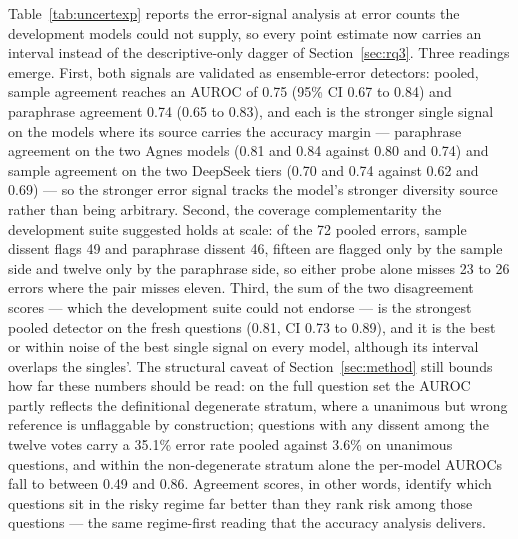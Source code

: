Table~\ref{tab:uncertexp} reports the error-signal analysis at error counts the development models could not supply, so every point estimate now carries an interval instead of the descriptive-only dagger of Section~\ref{sec:rq3}. Three readings emerge. First, both signals are validated as ensemble-error detectors: pooled, sample agreement reaches an AUROC of 0.75 (95\% CI 0.67 to 0.84) and paraphrase agreement 0.74 (0.65 to 0.83), and each is the stronger single signal on the models where its source carries the accuracy margin --- paraphrase agreement on the two Agnes models (0.81 and 0.84 against 0.80 and 0.74) and sample agreement on the two DeepSeek tiers (0.70 and 0.74 against 0.62 and 0.69) --- so the stronger error signal tracks the model's stronger diversity source rather than being arbitrary. Second, the coverage complementarity the development suite suggested holds at scale: of the 72 pooled errors, sample dissent flags 49 and paraphrase dissent 46, fifteen are flagged only by the sample side and twelve only by the paraphrase side, so either probe alone misses 23 to 26 errors where the pair misses eleven. Third, the sum of the two disagreement scores --- which the development suite could not endorse --- is the strongest pooled detector on the fresh questions (0.81, CI 0.73 to 0.89), and it is the best or within noise of the best single signal on every model, although its interval overlaps the singles'. The structural caveat of Section~\ref{sec:method} still bounds how far these numbers should be read: on the full question set the AUROC partly reflects the definitional degenerate stratum, where a unanimous but wrong reference is unflaggable by construction; questions with any dissent among the twelve votes carry a 35.1\% error rate pooled against 3.6\% on unanimous questions, and within the non-degenerate stratum alone the per-model AUROCs fall to between 0.49 and 0.86. Agreement scores, in other words, identify which questions sit in the risky regime far better than they rank risk among those questions --- the same regime-first reading that the accuracy analysis delivers.


